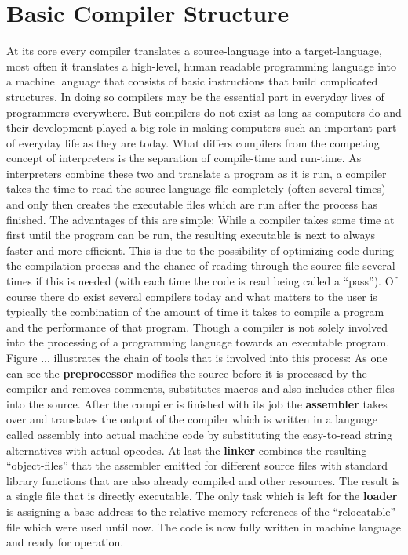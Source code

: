 \section{Basic Compiler Structure}
\label{section:compiler structure}
At its core every compiler translates a source-language into a target-language, most often it translates a high-level, human readable programming language into a machine language that consists of basic instructions that build complicated structures.
In doing so compilers may be the essential part in everyday lives of programmers everywhere.
But compilers do not exist as long as computers do and their development played a big role in making computers such an important part of everyday life as they are today.
What differs compilers from the competing concept of interpreters is the separation of compile-time and run-time.
As interpreters combine these two and translate a program as it is run, a compiler takes the time to read the source-language file completely (often several times) and only then creates the executable files which are run after the process has finished.
The advantages of this are simple:
While a compiler takes some time at first until the program can be run, the resulting executable is next to always faster and more efficient.
This is due to the possibility of optimizing code during the compilation process and the chance of reading through the source file several times if this is needed (with each time the code is read being called a ``pass'').
Of course there do exist several compilers today and what matters to the user is typically the combination of the amount of time it takes to compile a program and the performance of that program.
Though a compiler is not solely involved into the processing of a programming language towards an executable program.
Figure ... illustrates the chain of tools that is involved into this process:
As one can see the \textbf{preprocessor} modifies the source before it is processed by the compiler and removes comments, substitutes macros and also includes other files into the source.
After the compiler is finished with its job the \textbf{assembler} takes over and translates the output of the compiler which is written in a language called assembly into actual machine code by substituting the easy-to-read string alternatives with actual opcodes.
At last the \textbf{linker} combines the resulting ``object-files'' that the assembler emitted for different source files with standard library functions that are also already compiled and other resources. 
The result is a single file that is directly executable.
The only task which is left for the \textbf{loader} is assigning a base address to the relative memory references of the ``relocatable'' file which were used until now.
The code is now fully written in machine language and ready for operation.

